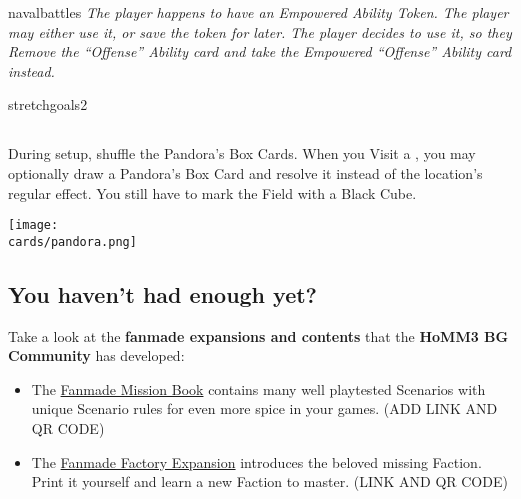 \begin{multicols*}{2}
\begin{expansion}[before=\vspace*{-11mm}]{navalbattles}
  \textit{The player happens to have an Empowered Ability Token.
    The player may either use it, or save the token for later.
    The player decides to use it, so they Remove the ``Offense'' Ability card and take the Empowered ``Offense'' Ability card instead.}

  \begin{center}
  \end{center}
\end{expansion}

\begin{expansion}{stretchgoals2}
  \subsection*{}
  During setup, shuffle the Pandora's Box Cards.
  When you Visit a , you may optionally draw a Pandora's Box Card and resolve it instead of the location's regular effect.
  You still have to mark the Field with a Black Cube.

  \medskip
  \begin{center}
    \texttt{[image: \\cards/pandora.png]}
  \end{center}
\end{expansion}

\vspace*{1em}

\subsection*{You haven't had enough yet?}
Take a look at the \textbf{fanmade expansions and contents} that the \textbf{HoMM3 BG Community} has developed:

  \begin{itemize}
    \item The \href{https://github.com/qwrtln/Homm3BG-mission-book}{Fanmade Mission Book} contains many well playtested Scenarios with unique Scenario rules for even more spice in your games. (ADD LINK AND QR CODE)
    \item The \href{https://github.com/piotrbruzda/Homm3BG-FactoryRulebook}{Fanmade Factory Expansion} introduces the beloved missing Faction. Print it yourself and learn a new Faction to master. (LINK AND QR CODE)
  \end{itemize}


\end{multicols*}
